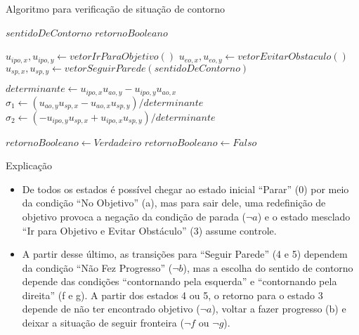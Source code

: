 \begin{frame}
	\begin{exampleblock}{Algoritmo para verificação de situação de contorno}
		\begin{algorithm}[H]
		\scriptsize
		\caption{Verificação de situação de deslize em fronteira}
		\begin{algorithmic}[1]
	
		\REQUIRE $sentidoDeContorno$
		\ENSURE $retornoBooleano$
	
		\STATE $u_{ipo, x}, u_{ipo, y} \leftarrow vetorIrParaObjetivo()$ 
		\STATE $u_{eo, x}, u_{eo, y} \leftarrow vetorEvitarObstaculo()$
		\STATE $u_{sp, x}, u_{sp, y} \leftarrow vetorSeguirParede(sentidoDeContorno)$
		
		\STATE $determinante \leftarrow u_{ipo, x} u_{ao, y} - u_{ipo, y} u_{ao, x}$
		\STATE $\sigma_1 \leftarrow (u_{ao, y} u_{sp, x} - u_{ao, x} u_{sp, y})/determinante$
		\STATE $\sigma_2 \leftarrow (-u_{ipo, y} u_{sp, x} + u_{ipo, x} u_{sp, y})/determinante$
		
			\STATE $retornoBooleano \leftarrow Verdadeiro$
		\ELSE
			\STATE $retornoBooleano \leftarrow Falso$
		\ENDIF
	
		\end{algorithmic}
		\end{algorithm}
	\end{exampleblock}
\end{frame}

\begin{frame}
	
\end{frame}

\begin{frame}
	\begin{block}{Explicação}
		\begin{itemize}
		  \item De todos os estados é possível chegar ao estado inicial ``Parar'' (0) por meio da 
		condição ``No Objetivo'' (a), mas para sair dele, uma redefinição de objetivo provoca
		a negação da condição de parada ($\neg a$) e o estado mesclado ``Ir para Objetivo e 
		Evitar Obstáculo'' (3) assume controle.
		\pause
		  \item A partir desse último, as transições para ``Seguir Parede'' (4 e 5) dependem da condição 
		``Não Fez Progresso'' ($\neg b$), mas a escolha do sentido de contorno depende das
		condições ``contornando pela esquerda'' e ``contornando pela direita'' (f e g). A partir
		dos estados 4 ou 5, o retorno para o estado 3 depende de não ter encontrado objetivo 
		($\neg a$), voltar a fazer progresso (b) e deixar a situação de seguir fronteira 
		($\neg f$ ou $\neg g$).
		\end{itemize}
	\end{block}
\end{frame}

